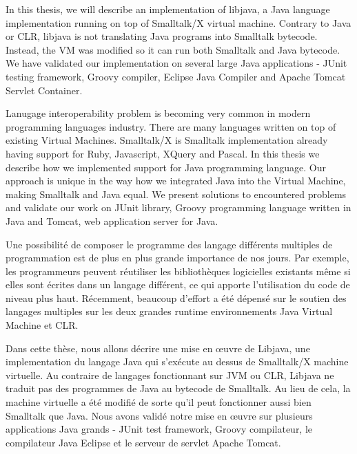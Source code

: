 \documentclass[11pt,twoside,a4paper]{book}
\newcommand{\libjava}{{Libjava}}
\begin{document}
In this thesis, we will describe an implementation of libjava, a Java language implementation
running on top of Smalltalk/X virtual machine. Contrary to Java or CLR, libjava is 
not translating Java programs into Smalltalk bytecode. Instead, the VM was modified
so it can run both Smalltalk and Java bytecode. We have validated our implementation
on several large Java applications - JUnit testing framework, Groovy compiler, 
Eclipse Java Compiler and Apache Tomcat Servlet Container. 


Lanugage interoperability problem is becoming very common in modern programming languages industry.
There are many languages written on top of existing Virtual Machines.
Smalltalk/X is Smalltalk implementation already having support for Ruby, Javascript, XQuery and Pascal. 
In this thesis we describe how we implemented support for Java programming language.
Our approach is unique in the way how we integrated Java into the Virtual Machine, making Smalltalk and Java equal.
We present solutions to encountered problems and validate our work on JUnit library, Groovy programming language written in Java and Tomcat, web application server for Java.

\baselineskip
\noindent

Une possibilité de composer le programme des langage différents multiples de programmation est de plus en plus grande importance de nos jours. 
Par exemple, les programmeurs peuvent réutiliser les bibliothèques logicielles existants même si elles sont écrites dans un langage différent, ce qui apporte l'utilisation du code de niveau plus haut.
Récemment, beaucoup d'effort a été dépensé sur le soutien des langages multiples sur les deux grandes runtime environnements Java Virtual Machine et CLR.

Dans cette thèse, nous allons décrire une mise en œuvre de \libjava{}, une implementation du langage Java qui s'exécute au dessus de Smalltalk/X machine virtuelle.
 Au contraire de langages fonctionnant sur JVM ou CLR, \libjava{} ne traduit pas des programmes de Java au bytecode de Smalltalk. 
Au lieu de cela, la machine virtuelle a été modifié de sorte qu'il peut fonctionner aussi bien Smalltalk que Java.
Nous avons validé notre mise en œuvre sur plusieurs applications Java grands - JUnit test framework, Groovy compilateur, le compilateur Java Eclipse et le serveur de servlet Apache Tomcat.
\end{document}

